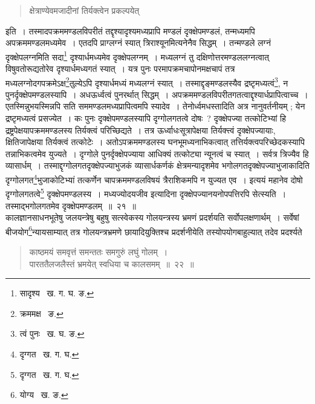 \documentclass[11pt, openany]{book}
\begin{document}
\begin{quote} 
{\qt क्षेत्राण्येवमजादीनां तिर्यक्त्वेन प्रकल्पयेत्}
\end{quote} 

\newpage

\noindent इति~। तस्मादपक्रममण्डलविपरीतं तद्दृश्यादृश्यमध्यप्रापि मण्डलं दृक्क्षेपमण्डलं, तन्मध्यमपि अपक्रममण्डलमध्यमेव~। एतदपि प्राग्लग्नं स्यात् त्रिराश्यूनमित्यनेनैव सिद्धम्~। तन्मण्डले लग्नं दृक्क्षेपलग्नमिति सदा\renewcommand{\thefootnote}{१}\footnote{सादृश्य \textendash\ ख. ग. घ. ङ.} दृश्यार्धमध्यमेव दृक्क्षेपलग्नम्~। मध्यलग्नं तु दक्षिणोत्तरमण्डललग्नत्वात् विषुवतोरूद्यतोरेव दृश्यार्धमध्यगतं स्यात्~। यत्र पुनः परमापक्रमचापोनमक्षचापं 
तत्र मध्यलग्नोदगपक्रमेऽक्ष\renewcommand{\thefootnote}{२}\footnote{क्रममक्ष \textendash\ ङ.}तुल्येऽपि दृश्यार्धमध्यं मध्यलग्नं स्यात्~। तस्माद्दृङ्मण्डलस्यैव द्रष्टृमध्यत्वं\renewcommand{\thefootnote}{३}\footnote{त्वं पुनः \textendash\ ख. घ. ङ.}, न 
पुनर्दृक्क्षेपमण्डलस्यापि~। अधऊर्ध्वत्वं पुनरर्थात् सिद्धम्~। अपक्रममण्डलविपरीतगतत्वाद्दृश्यार्धप्रापित्वाच्च~। एतस्मिन्नुभयस्मिन्नपि सति सममण्डलमध्यप्रापित्वमपि स्यादेव~। तेनोर्ध्वमधस्तादिति अत्र नानुवर्तनीयम् ; येन द्रष्टृमध्यत्वं प्रसज्येत~। कः पुनः दृक्क्षेपमण्डलस्यापि दृग्गोलगतत्वे दोषः~? दृक्क्षेपज्या तत्कोटिभ्यां हि द्रष्ट्रपेक्षयापक्रममण्डलस्य तिर्यक्त्वं परिच्छिद्यते~। तत्र ऊर्ध्वाधःसूत्रापेक्षया तिर्यक्त्त्वं दृक्क्षेपज्यायाः, क्षितिजापेक्षया तिर्यक्त्वं तत्कोटेः~। अतोऽपक्रममण्डलस्य घनभूमध्यनाभिकत्वात् तत्तिर्यक्त्वपरिच्छेदकस्यापि तन्नाभिकत्वमेव युज्यते~। दृग्गोले पुनर्दृक्क्षेपज्याया आधिक्यं तत्कोट्या न्यूनत्वं च स्यात्~। सर्वत्र त्रिज्यैव हि व्यासार्धम्~। तस्माद्दृग्गोलगतदृक्क्षेपज्याभुजकं व्यासार्धकर्णकं क्षेत्रमन्यादृशमेव भगोलगतदृक्क्षेपज्याभुजाकादिति दृग्गोलगत\renewcommand{\thefootnote}{४}\footnote{दृग्गत \textendash\ ख. ग. घ.}भुजाकोटिभ्यां तत्कर्णेन चापक्रममण्डलविषयं त्रैराशिकमपि न युज्यत एव~। इत्ययं महानेव दोषो दृग्गोलगतत्वे\renewcommand{\thefootnote}{५}\footnote{दृग्गत \textendash\ ख. ग. घ.} दृक्क्षेपमण्डलस्य~। {\qt मध्यज्योदयजीव} इत्यादिना दृक्क्षेपज्यानयनोपपत्तिरपि सेत्स्यति~। तस्माद्भगोलगतमेव दृक्क्षेपमण्डलम्~॥~२१~॥ \\

\indent कालज्ञानसाधनभूतेषु जलयन्त्रेषु बहुषु सत्स्वेकस्य गोलयन्त्रस्य भ्रमणं प्रदर्शयति सर्वोपलक्षणार्थम्~। सर्वेषां बीजयोग\renewcommand{\thefootnote}{६}\footnote{योग्य \textendash\ ख. ङ.}न्यायसाम्यात् तत्र गोलयन्त्रभ्रमणे छायादियुक्तिश्च प्रदर्शनीयेति तस्योपयोगबाहुल्यात् तदेव प्रदर्श्यते\textendash 

\newpage

\begin{quote}
{\ab काष्ठमयं समवृत्तं समन्ततः समगुरुं लघुं गोलम्~। \\
पारततैलजलैस्तं भ्रमयेत् स्वधिया च कालसमम्~॥~२२~॥} 
\end{quote}
\end{document}
